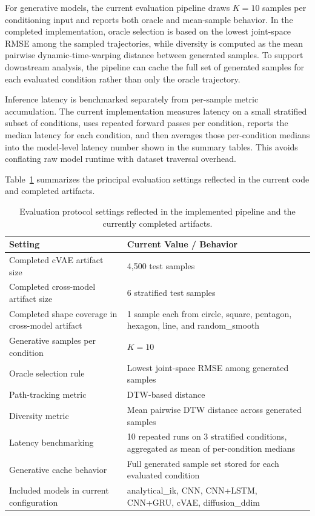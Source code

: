 \documentclass[11pt]{article}
\begin{document}
For generative models, the current evaluation pipeline draws $K=10$ samples per conditioning input and reports both oracle and mean-sample behavior. In the completed implementation, oracle selection is based on the lowest joint-space RMSE among the sampled trajectories, while diversity is computed as the mean pairwise dynamic-time-warping distance between generated samples. To support downstream analysis, the pipeline can cache the full set of generated samples for each evaluated condition rather than only the oracle trajectory.

Inference latency is benchmarked separately from per-sample metric accumulation. The current implementation measures latency on a small stratified subset of conditions, uses repeated forward passes per condition, reports the median latency for each condition, and then averages those per-condition medians into the model-level latency number shown in the summary tables. This avoids conflating raw model runtime with dataset traversal overhead.

Table~\ref{tab:eval_protocol} summarizes the principal evaluation settings reflected in the current code and completed artifacts.

\begin{table}[h]
\centering
\caption{Evaluation protocol settings reflected in the implemented pipeline and the currently completed artifacts.}
\label{tab:eval_protocol}
\begin{tabular}{p{5.2cm}p{8.6cm}}
\toprule
Setting & Current Value / Behavior \\
\midrule
Completed cVAE artifact size & 4,500 test samples \\
Completed cross-model artifact size & 6 stratified test samples \\
Completed shape coverage in cross-model artifact & 1 sample each from circle, square, pentagon, hexagon, line, and random\_smooth \\
Generative samples per condition & $K=10$ \\
Oracle selection rule & Lowest joint-space RMSE among generated samples \\
Path-tracking metric & DTW-based distance \\
Diversity metric & Mean pairwise DTW distance across generated samples \\
Latency benchmarking & 10 repeated runs on 3 stratified conditions, aggregated as mean of per-condition medians \\
Generative cache behavior & Full generated sample set stored for each evaluated condition \\
Included models in current configuration & analytical\_ik, CNN, CNN+LSTM, CNN+GRU, cVAE, diffusion\_ddim \\
\bottomrule
\end{tabular}
\end{table}
\end{document}
